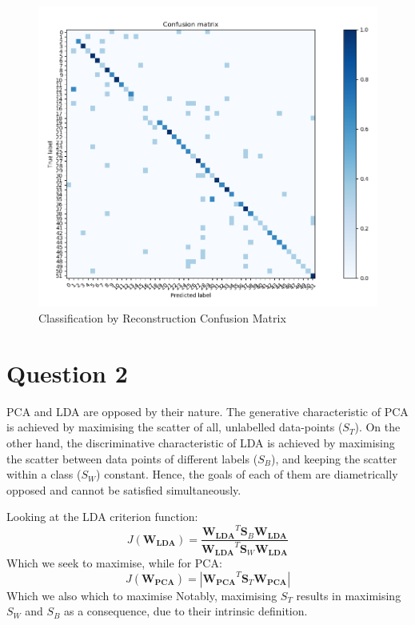 \documentclass[10pt,technote]{IEEEtran}
\begin{document}
\begin{figure}[htb!]
    \centering
    \includegraphics[width=\linewidth]{../results/1bb/confusion_rec.png}
    \caption{Classification by Reconstruction Confusion Matrix}
    \label{fig:REC_conf_mat}
\end{figure}

\section{Question 2}

PCA and LDA are opposed by their nature. The generative characteristic of PCA is achieved by maximising the scatter of all, unlabelled data-points ($S_T$). On the other hand, the discriminative characteristic of LDA is achieved by maximising the scatter between data points of different labels ($S_B$), and keeping the scatter within a class ($S_W$) constant. Hence, the goals of each of them are diametrically opposed and cannot be satisfied simultaneously.

Looking at the LDA criterion function:
\begin{equation}
    J(\boldsymbol{W_{LDA}}) = \frac{\boldsymbol{W_{LDA}}^T\boldsymbol{S}_B\boldsymbol{W_{LDA}}}{\boldsymbol{W_{LDA}}^T\boldsymbol{S}_W\boldsymbol{W_{LDA}}}
\end{equation}
Which we seek to maximise, while for PCA:
\begin{equation}
    J(\boldsymbol{W_{PCA}}) = |\boldsymbol{W_{PCA}}^T\boldsymbol{S}_T\boldsymbol{W_{PCA}}|
\end{equation}
Which we also which to maximise
Notably, maximising $S_T$ results in maximising $S_W$ and $S_B$ as a consequence, due to their intrinsic definition.
\end{document}
